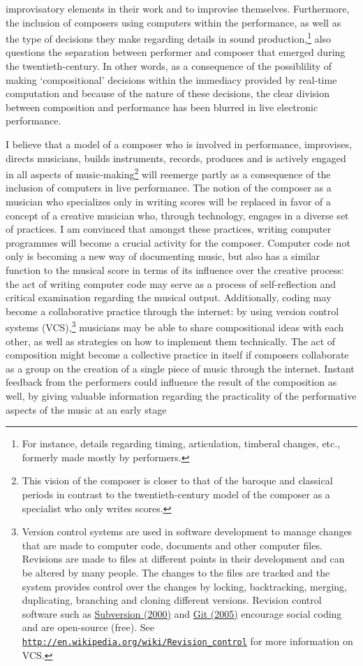 improvisatory elements in their work and to improvise themselves. Furthermore, the inclusion of composers using computers within the performance, as well as the type of decisions they make regarding details in sound production,\footnote{For instance, details regarding timing, articulation, timberal changes, etc., formerly made mostly by performers.} also questions the separation between performer and composer that emerged during the twentieth-century. In other words, as a consequence of the possiblility of making `compositional' decisions within the immediacy provided by real-time computation and because of the nature of these decisions, the clear division between composition and performance has been blurred in live electronic performance. 

I believe that a model of a composer who is involved in performance, improvises, directs musicians, builds instruments, records, produces and is actively engaged in all aspects of music-making\footnote{This vision of the composer is closer to that of the baroque and classical periods in contrast to the twentieth-century model of the composer as a specialist who only writes scores.} will reemerge partly as a consequence of the inclusion of computers in live performance. The notion of the composer as a musician who specializes only in writing scores will be replaced in favor of a concept of a creative musician who, through technology, engages in a diverse set of practices. \hypertarget{codingcons}{}I am convinced that amongst these practices, writing computer programmes will become a crucial activity for the composer. Computer code not only is becoming a new way of documenting music, but also has a similar function to the musical score in terms of its influence over the creative process: the act of writing computer code may serve as a process of self-reflection and critical examination regarding the musical output. Additionally, coding may become a collaborative practice through the internet: by using version control systems (VCS),\footnote{Version control systems are used in software development to manage changes that are made to computer code, documents and other computer files. Revisions are made to files at different points in their development and can be altered by many people. The changes to the files are tracked and the system provides control over the changes by locking, backtracking, merging, duplicating, branching and cloning different versions. Revision control software such as \href{http://subversion.tigris.org/}{Subversion (2000)} and \href{http://git-scm.com/}{Git (2005)} encourage social coding and are open-source (free). See \href{http://en.wikipedia.org/wiki/Revision_control} {\texttt{http://en.wikipedia.org/wiki/Revision\_control}} for more information on VCS.} musicians may be able to share compositional ideas with each other, as well as strategies on how to implement them technically. The act of composition might become a collective practice in itself if composers collaborate as a group on the creation of a single piece of music through the internet. Instant feedback from the performers could influence the result of the composition as well, by giving valuable information regarding the practicality of the performative aspects of the music at an early stage 